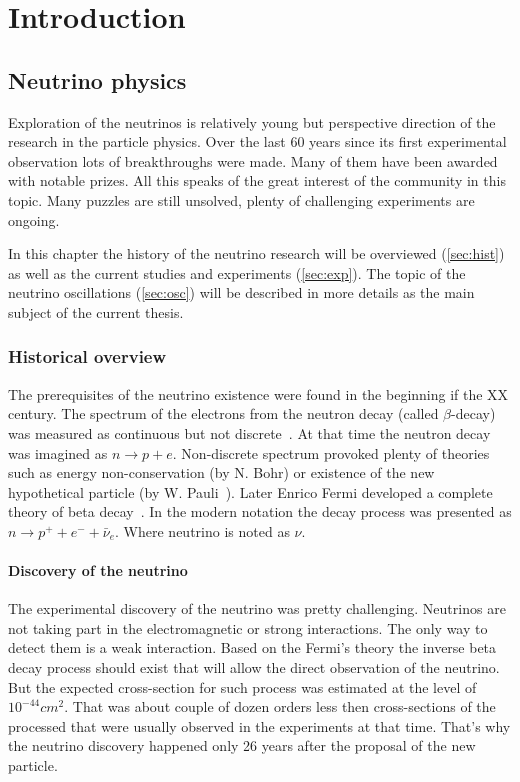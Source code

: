 \documentclass[../main.tex]{subfiles}
\begin{document}
\renewcommand{\labelitemi}{\ding{226}}
\renewcommand{\labelitemii}{\ding{227}}


\part{Introduction}
\label{part:intro:general}

\chapter{Neutrino physics}
\label{ch:nu_phys}
Exploration of the neutrinos is relatively young but perspective direction of the research in the particle physics. Over the last 60 years since its first experimental observation lots of breakthroughs were made. Many of them have been awarded with notable prizes. All this speaks of the great interest of the community in this topic. Many puzzles are still unsolved, plenty of challenging experiments are ongoing.

In this chapter the history of the neutrino research will be overviewed (\autoref{sec:hist}) as well as the current studies and experiments (\autoref{sec:exp}). The topic of the neutrino oscillations (\autoref{sec:osc}) will be described in more details as the main subject of the current thesis.

\section{Historical overview}
\label{sec:hist}
The prerequisites of the neutrino existence were found in the beginning if the XX century. The spectrum of the electrons from the neutron decay (called $\beta$-decay) was measured as continuous but not discrete~\cite{Chadwick1914}. At that time the neutron decay was imagined as $n\to p+e$. Non-discrete spectrum provoked plenty of theories such as energy non-conservation (by N. Bohr) or existence of the new hypothetical particle (by W. Pauli~\cite{Pauli1930}). Later Enrico Fermi developed a complete theory of beta decay~\cite{Fermi1934}. In the modern notation the decay process was presented as $n\to p^++e^-+\bar{\nu}_e$. Where neutrino is noted as $\nu$.

\subsection{Discovery of the neutrino}
The experimental discovery of the neutrino was pretty challenging. Neutrinos are not taking part in the electromagnetic or strong interactions. The only way to detect them is a weak interaction. Based on the Fermi's theory the inverse beta decay process should exist that will allow the direct observation of the neutrino. But the expected cross-section for such process was estimated at the level of $10^{-44} cm^2$. That was about couple of dozen orders less then cross-sections of the processed that were usually observed in the experiments at that time. That's why the neutrino discovery happened only 26 years after the proposal of the new particle.
\end{document}
